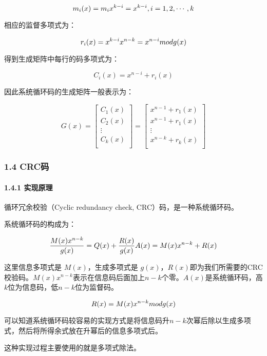 \documentclass[
]{article}
\begin{document}
$$
m_i(x)=m_ix^{k-i}=x^{k-i},\space i=1,2,\cdots,k
$$

相应的监督多项式为：

$$
r_i(x)=x^{k-i}x^{n-k}=x^{n-i}\space mod \space g(x)
$$

得到生成矩阵中每行的码多项式为：

$$
C_i(x)=x^{n-i}+r_i(x)
$$

因此系统循环码的生成矩阵一般表示为：

$$
G(x)=
\left[
\begin{matrix}
C_1(x)\\
C_2(x)\\
 \vdots \\
C_k(x)\\
\end{matrix}
\right]
=
\left[
\begin{matrix}
x^{n-1}+r_1(x)\\
x^{n-1}+r_1(x)\\
 \vdots \\
x^{n-k}+r_k(x)\\
\end{matrix}
\right]
$$

\hypertarget{header-n78}{%
\subsubsection{1.4 CRC码}\label{header-n78}}

\hypertarget{header-n79}{%
\paragraph{1.4.1 实现原理}\label{header-n79}}

循环冗余校验（Cyclic redundancy check, CRC）码，是一种系统循环码。

系统循环码的构成为：

$$
\frac{M(x)x^{n-k}}{g(x)} = Q(x) + \frac{R(x)}{g(x)}\\
A(x)=M(x)x^{n-k}+R(x)
$$

这里信息多项式是 $M(x)$，生成多项式是
$g(x)$，$R(x)$即为我们所需要的CRC校验码。$M(x)x^{n-k}$表示在信息码后面加上$n-k$个零。$A(x)$是系统循环码，高$k$位为信息码，低$n-k$位为监督码。

$$
R(x)=M(x)x^{n-k} \space mod \space g(x)
$$

可以知道系统循环码较容易的实现方式是将信息码升$n-k$次幂后除以生成多项式，然后将所得余式放在升幂后的信息多项式后。

这种实现过程主要使用的就是多项式除法。
\end{document}
